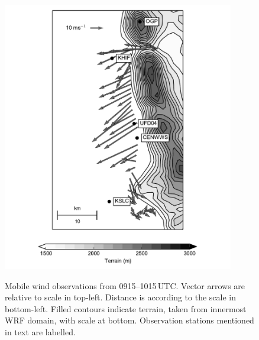 \documentclass[pdftex,12pt]{article}
\begin{document}
\begin{figure}[t]
\centering
\includegraphics[width=0.9\textwidth]{mobmes_09.pdf}\\
\caption{Mobile wind observations from 0915--1015\,UTC. Vector arrows are relative to scale in top-left. Distance is according to the scale in bottom-left. Filled contours indicate terrain, taken from innermost WRF domain, with scale at bottom. Observation stations mentioned in text are labelled.}
\label{fig:mobmes}
\end{figure}
\end{document}

